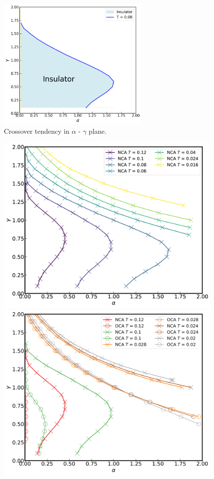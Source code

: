 \documentclass{article}[12pt]
\begin{document}
\begin{spacing}{1.3}
\begin{figure}[H]
  \centerline{\includegraphics[width=7.5cm]{TexFigure/4/4_3_07_Simplefig.png}}
  \caption{Crossover tendency in $\alpha$ - $\gamma$ plane.}
\end{figure}
\pagebreak
\newpage
\begin{figure}[H]
  \centerline{\includegraphics[width=13cm]{TexFigure/4/4_3_08_3dplot_Ns3_proj_n-1.png}}
  \centerline{\includegraphics[width=13cm]{TexFigure/4/4_3_09_3dplot_COMP3_proj_n-1.png}}

\end{figure}
\end{spacing}
\end{document}
